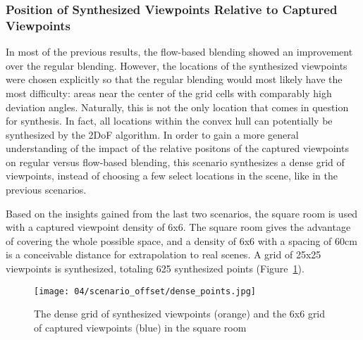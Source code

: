 \subsubsection{Position of Synthesized Viewpoints Relative to Captured Viewpoints}
In most of the previous results, the flow-based blending showed an improvement over the regular blending. However, the locations of the synthesized viewpoints were chosen explicitly so that the regular blending would most likely have the most difficulty: areas near the center of the grid cells with comparably high deviation angles. Naturally, this is not the only location that comes in question for synthesis. In fact, all locations within the convex hull can potentially be synthesized by the 2DoF algorithm. In order to gain a more general understanding of the impact of the relative positons of the captured viewpoints on regular versus flow-based blending, this scenario synthesizes a dense grid of viewpoints, instead of choosing a few select locations in the scene, like in the previous scenarios.

Based on the insights gained from the last two scenarios, the square room is used with a captured viewpoint density of 6x6. The square room gives the advantage of covering the whole possible space, and a density of 6x6 with a spacing of 60cm is a conceivable distance for extrapolation to real scenes. A grid of 25x25 viewpoints is synthesized, totaling 625 synthesized points (Figure~\ref{fig:scenario_offset_setup}).

\begin{figure}
		\centering
		\texttt{[image: 04/scenario\_offset/dense\_points.jpg]}
		\caption[The dense grid of synthesized viewpoints in the square room]{The dense grid of synthesized viewpoints (orange) and the 6x6 grid of captured viewpoints (blue) in the square room}
		\label{fig:scenario_offset_setup}
\end{figure}

